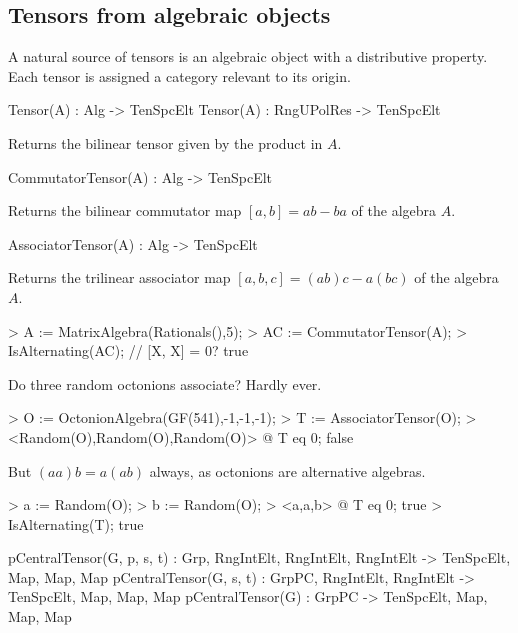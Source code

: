 \subsection{Tensors from algebraic objects}
A natural source of tensors is an algebraic object with a distributive 
property.
Each tensor is assigned a category relevant to its origin. 


\begin{intrinsics}
Tensor(A) : Alg -> TenSpcElt
Tensor(A) : RngUPolRes -> TenSpcElt
\end{intrinsics}

Returns the bilinear tensor given by the product in $A$.

\begin{intrinsics}
CommutatorTensor(A) : Alg -> TenSpcElt
\end{intrinsics}

Returns the bilinear commutator map $[a,b]=ab-ba$ of the algebra $A$.

\begin{intrinsics}
AssociatorTensor(A) : Alg -> TenSpcElt
\end{intrinsics}

Returns the trilinear associator map $[a,b,c]=(ab)c-a(bc)$ of the algebra $A$.

\begin{example}
\begin{code}
> A := MatrixAlgebra(Rationals(),5);
> AC := CommutatorTensor(A);
> IsAlternating(AC); // [X, X] = 0?
true
\end{code}

Do three random octonions associate? Hardly ever.

\begin{code}
> O := OctonionAlgebra(GF(541),-1,-1,-1);
> T := AssociatorTensor(O);
> <Random(O),Random(O),Random(O)> @ T eq 0;
false
\end{code}

But $(aa)b=a(ab)$ always, as octonions are alternative algebras.

\begin{code}
> a := Random(O); 
> b := Random(O); 
> <a,a,b> @ T eq 0;
true
> IsAlternating(T);
true
\end{code}
\end{example}


\begin{intrinsics}
pCentralTensor(G, p, s, t) : 
    Grp, RngIntElt, RngIntElt, RngIntElt -> TenSpcElt, Map, Map, Map
pCentralTensor(G, s, t) : GrpPC, RngIntElt, RngIntElt -> TenSpcElt, Map, Map, Map
pCentralTensor(G) : GrpPC -> TenSpcElt, Map, Map, Map
\end{intrinsics}

